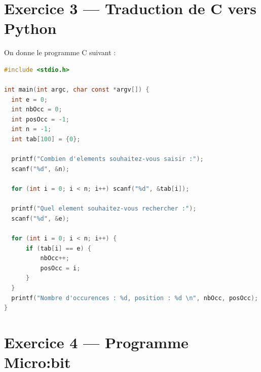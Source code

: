 \documentclass[11pt,a4paper]{exam}
\begin{document}
\newpage

\section*{Exercice 3 — Traduction de C vers Python}

\begin{questions}
\question On donne le programme C suivant :

\begin{lstlisting}[language=C]
#include <stdio.h>

int main(int argc, char const *argv[]) {
  int e = 0;
  int nbOcc = 0;
  int posOcc = -1;
  int n = -1;
  int tab[100] = {0};

  printf("Combien d'elements souhaitez-vous saisir :");
  scanf("%d", &n);

  for (int i = 0; i < n; i++) scanf("%d", &tab[i]);

  printf("Quel element souhaitez-vous rechercher :");
  scanf("%d", &e);

  for (int i = 0; i < n; i++) {
      if (tab[i] == e) {
          nbOcc++;
          posOcc = i;
      }
  }
  printf("Nombre d'occurences : %d, position : %d \n", nbOcc, posOcc);
}
\end{lstlisting}

\end{questions}

\newpage

\section*{Exercice 4 — Programme Micro:bit}
\end{document}
